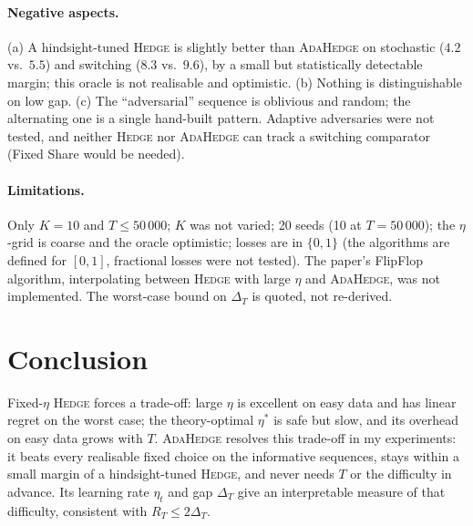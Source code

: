 \documentclass[11pt,a4paper]{article}
\newcommand{\Hedge}{\textsc{Hedge}}
\newcommand{\Ada}{\textsc{AdaHedge}}
\begin{document}
\paragraph{Negative aspects.}
(a) A hindsight-tuned \Hedge{} is slightly better than \Ada{} on stochastic ($4.2$ vs.\ $5.5$) and switching ($8.3$ vs.\ $9.6$), by a small but statistically detectable margin; this oracle is not realisable and optimistic.
(b) Nothing is distinguishable on low gap.
(c) The ``adversarial'' sequence is oblivious and random; the alternating one is a single hand-built pattern. Adaptive adversaries were not tested, and neither \Hedge{} nor \Ada{} can track a switching comparator (Fixed Share would be needed).

\paragraph{Limitations.}
Only $K=10$ and $T\le50\,000$; $K$ was not varied; 20 seeds (10 at $T=50\,000$); the $\eta$-grid is coarse and the oracle optimistic; losses are in $\{0,1\}$ (the algorithms are defined for $[0,1]$, fractional losses were not tested).
The paper's FlipFlop algorithm, interpolating between \Hedge{} with large $\eta$ and \Ada{}, was not implemented. The worst-case bound on $\Delta_T$ is quoted, not re-derived.

\section{Conclusion}\label{sec:conclusion}
Fixed-$\eta$ \Hedge{} forces a trade-off: large $\eta$ is excellent on easy data and has linear regret on the worst case; the theory-optimal $\eta^*$ is safe but slow, and its overhead on easy data grows with $T$. \Ada{} resolves this trade-off in my experiments: it beats every realisable fixed choice on the informative sequences,
stays within a small margin of a hindsight-tuned \Hedge{}, and never needs $T$ or the difficulty in advance. Its learning rate $\eta_t$ and gap $\Delta_T$ give an interpretable measure of that difficulty, consistent with $R_T\le2\Delta_T$.

\appendix
\end{document}
